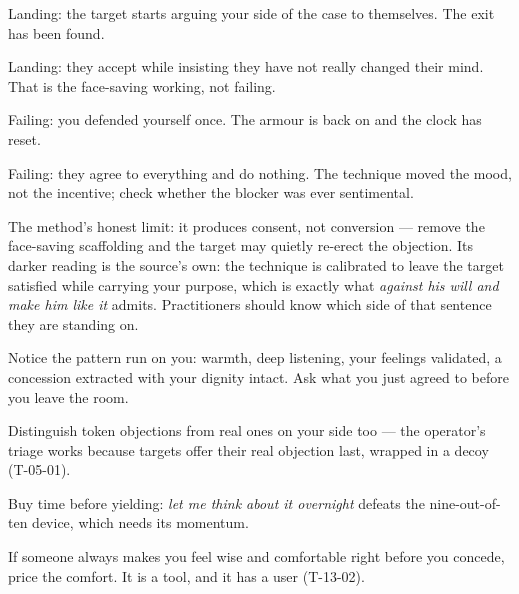 \begin{feedback}
  \item Landing: the target starts arguing your side of the case to themselves. The exit has been found.
  \item Landing: they accept while insisting they have not really changed their mind. That is the face-saving working, not failing.
  \item Failing: you defended yourself once. The armour is back on and the clock has reset.
  \item Failing: they agree to everything and do nothing. The technique moved the mood, not the incentive; check whether the blocker was ever sentimental.
\end{feedback}
\begin{failure}
The method's honest limit: it produces consent, not conversion --- remove the face-saving scaffolding and the target may quietly re-erect the objection. Its darker reading is the source's own: the technique is calibrated to leave the target satisfied while carrying your purpose, which is exactly what \emph{against his will and make him like it} admits. Practitioners should know which side of that sentence they are standing on.
\end{failure}
\begin{countermeasures}
  \item Notice the pattern run on you: warmth, deep listening, your feelings validated, a concession extracted with your dignity intact. Ask what you just agreed to before you leave the room.
  \item Distinguish token objections from real ones on your side too --- the operator's triage works because targets offer their real objection last, wrapped in a decoy (T-05-01).
  \item Buy time before yielding: \emph{let me think about it overnight} defeats the nine-out-of-ten device, which needs its momentum.
  \item If someone always makes you feel wise and comfortable right before you concede, price the comfort. It is a tool, and it has a user (T-13-02).
\end{countermeasures}

\seesources
{}
